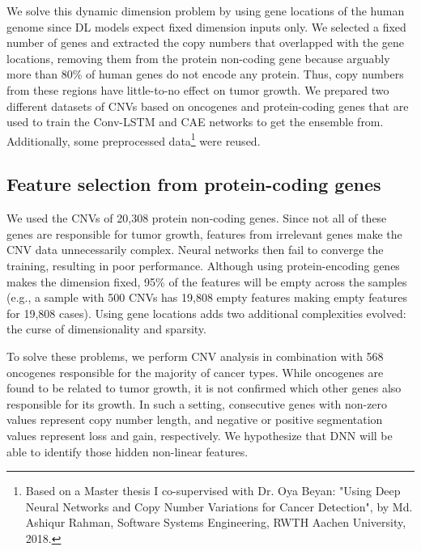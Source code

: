 \hspace*{3.5mm} We solve this dynamic dimension problem by using gene locations of the human genome since DL models expect fixed dimension inputs only. We selected a fixed number of genes and extracted the copy numbers that overlapped with the gene locations, removing them from the protein non-coding gene because arguably more than 80\% of human genes do not encode any protein. Thus, copy numbers from these regions have little-to-no effect on tumor growth. %
We prepared two different datasets of CNVs based on oncogenes and protein-coding genes that are used to train the Conv-LSTM and CAE networks to get the ensemble from. Additionally, some preprocessed data\footnote{Based on a Master thesis I co-supervised with Dr. Oya Beyan: "Using Deep Neural Networks and Copy Number Variations for Cancer Detection", by Md. Ashiqur Rahman, Software Systems Engineering, RWTH Aachen University, 2018.} were reused. %

\subsection{Feature selection from protein-coding genes}
We used the CNVs of 20,308 protein non-coding genes. Since not all of these genes are responsible for tumor growth, features from irrelevant genes make the CNV data unnecessarily complex. Neural networks then fail to converge the training, resulting in poor performance. Although using protein-encoding genes makes the dimension fixed, 95\% of the features will be empty across the samples (e.g., a sample with 500 CNVs has 19,808 empty features making empty features for 19,808 cases). Using gene locations adds two additional complexities evolved: the curse of dimensionality and sparsity. 

\hspace*{3.5mm} To solve these problems, we perform CNV analysis in combination with 568 oncogenes responsible for the majority of cancer types. While oncogenes are found to be related to tumor growth, it is not confirmed which other genes also responsible for its growth. In such a setting, consecutive genes with non-zero values represent copy number length, and negative or positive segmentation values represent loss and gain, respectively. We hypothesize that DNN will be able to identify those hidden non-linear features. 

